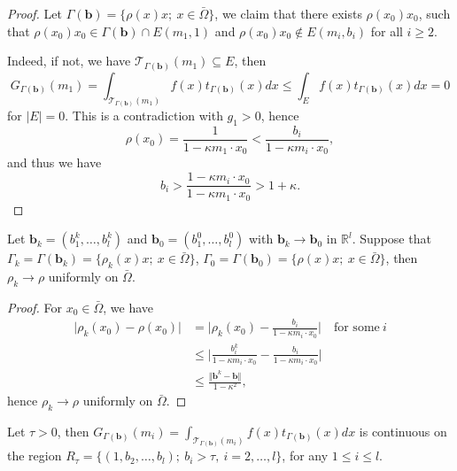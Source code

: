 \documentclass[a4paper,12pt,]{article}
\newtheorem{lemma}{\hskip\parindent\bf Lemma}[section]%
\numberwithin{equation}{section}
\numberwithin{equation}{section} \allowdisplaybreaks
\begin{document}
\begin{proof}
  Let $\Gamma(\mathbf{b}) = \{\rho(x)x;~x\in \bar{\Omega}\}$, we claim that there exists $\rho(x_{0})x_{0}$, such that $\rho(x_{0})x_{0} \in \Gamma(\mathbf{b}) \cap E(m_{1},1)$ and $\rho(x_{0})x_{0} \notin E(m_{i},b_{i})$ for all $i \geq 2$.

  Indeed, if not, we have $\mathcal{T}_{\Gamma(\mathbf{b})}(m_{1}) \subseteq E$, then
  $$G_{\Gamma(\mathbf{b})}(m_{1}) = \int_{\mathcal{T}_{\Gamma(\mathbf{b})}(m_{1})} f(x)t_{\Gamma(\mathbf{b})}(x)dx \leq \int_{E} f(x)t_{\Gamma(\mathbf{b})}(x)dx = 0$$
  for $\vert E \vert =0$. This is a contradiction with $g_{1} >0$, hence
  $$\rho(x_{0}) = \frac{1}{1 - \kappa m_{1} \cdot x_{0}} < \frac{b_{i}}{1 - \kappa m_{i} \cdot x_{0}},$$
  and thus we have
  $$b_{i} > \frac{1 - \kappa m_{i} \cdot x_{0}}{1 - \kappa m_{1} \cdot x_{0}} > 1 + \kappa.$$
\end{proof}

\begin{lemma}
  Let $\mathbf{b}_{k} = (b_{1}^{k},\ldots,b_{l}^{k})$ and $\mathbf{b}_{0} = (b_{1}^{0},\ldots,b_{l}^{0})$ with $\mathbf{b}_{k}\rightarrow \mathbf{b}_{0}$ in $\mathbb{R}^{l}$. Suppose that $\Gamma_{k} = \Gamma(\mathbf{b}_{k}) = \{\rho_{k}(x)x;~x\in \bar{\Omega}\}$, $\Gamma_{0} = \Gamma(\mathbf{b}_{0}) = \{\rho(x)x;~x\in \bar{\Omega}\}$, then $\rho_{k} \rightarrow \rho$ uniformly on $\bar{\Omega}$.
  \label{lem4.9}
\end{lemma}

\begin{proof}
  For $x_{0} \in \bar{\Omega}$, we have
  \begin{align*}
    \vert \rho_{k}(x_{0}) - \rho(x_{0}) \vert& = \vert \rho_{k}(x_{0}) - \frac{b_{i}}{1 - \kappa m_{i} \cdot x_{0}}  \vert \quad \text{for some}~i  \\
     & \leq  \vert \frac{b_{i}^{k}}{1 - \kappa m_{i} \cdot x_{0}} - \frac{b_{i}}{1 - \kappa m_{i} \cdot x_{0}} \vert \\
     & \leq \frac{\Vert \mathbf{b}^{k} - \mathbf{b} \Vert}{1 -\kappa^{2}},
  \end{align*}
  hence $\rho_{k} \rightarrow \rho$ uniformly on $\bar{\Omega}$.
\end{proof}

\begin{lemma}
  Let $\tau >0$, then $G_{\Gamma(\mathbf{b})}(m_{i}) = \displaystyle\int_{\mathcal{T}_{\Gamma(\mathbf{b})}(m_{i})}f(x)t_{\Gamma(\mathbf{b})}(x)dx$ is continuous on the region $R_{\tau} = \{(1,b_{2},\ldots, b_{l});~b_{i}> \tau,~i=2,\ldots,l\}$, for any $1 \leq i \leq l$.
  \label{lem4.10}
\end{lemma}
\end{document}
